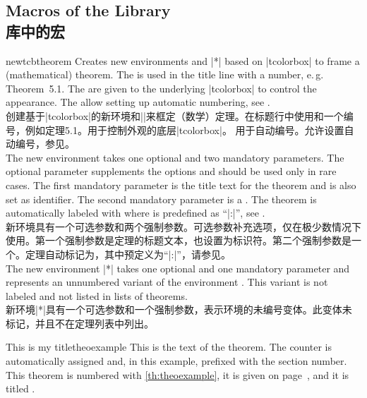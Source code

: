 
\subsection{Macros of the Library\\库中的宏}

\begin{docCommand}[doc updated=2016-06-22]{newtcbtheorem}{}
Creates new environments  and |*| based on |tcolorbox| to frame a
(mathematical) theorem. The  is used in the title line
with a number, e.\,g. \mbox{\flqq Theorem 5.1\frqq}.
The  are given to the underlying |tcolorbox| to control
the appearance.
The  allow setting up automatic numbering,
see .\\
创建基于|tcolorbox|的新环境和||来框定（数学）定理。在标题行中使用和一个编号，例如\mbox{\flqq 定理5.1\frqq}。用于控制外观的底层|tcolorbox|。 用于自动编号。允许设置自动编号，参见。\\[0.5em]
The new environment  takes one optional and two mandatory
parameters. The optional parameter supplements the options and should be
used only in rare cases.
The first mandatory parameter is the title text for the theorem and
is also set as  identifier.
The second mandatory parameter is a . The theorem is
automatically labeled with 
where  is predefined as \enquote{|:|}, see .\\
新环境具有一个可选参数和两个强制参数。可选参数补充选项，仅在极少数情况下使用。第一个强制参数是定理的标题文本，也设置为标识符。第二个强制参数是一个。定理自动标记为，其中预定义为\enquote{|:|}，请参见。\\[0.5em]
The new environment |*| takes one optional and one mandatory
parameter and represents an unnumbered variant of the environment .
This variant is not labeled and not listed in lists of theorems.\\
新环境|*|具有一个可选参数和一个强制参数，表示环境的未编号变体。此变体未标记，并且不在定理列表中列出。
\enlargethispage*{20mm}
\begin{dispExample}
\begin{mytheo}{This is my title}{theoexample}
This is the text of the theorem. The counter is automatically assigned and,
in this example, prefixed with the section number. This theorem is numbered with
\ref{th:theoexample}, it is given on page~\pageref{th:theoexample},
and it is titled \flqq{}\frqq.


\end{mytheo}
\end{dispExample}
\end{docCommand}
